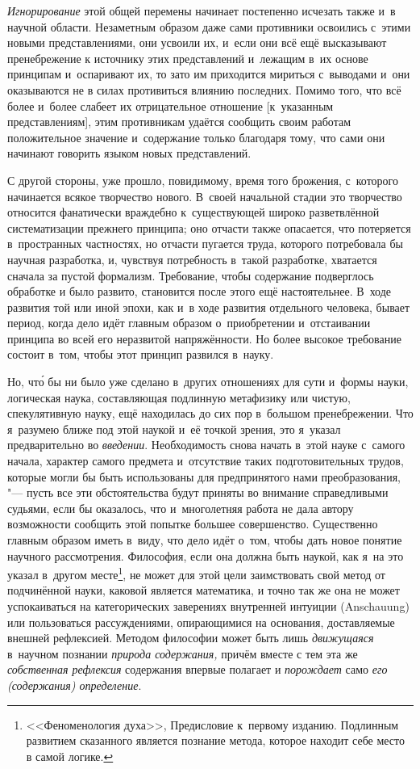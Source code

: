 {\em Игнорирование} этой общей перемены начинает постепенно исчезать также и~в
научной области. Незаметным образом даже сами противники освоились с~этими
новыми представлениями, они усвоили их, и~если они всё ещё высказывают пренебрежение
к источнику этих представлений и~лежащим в~их основе принципам и~оспаривают
их, то зато им приходится мириться с~выводами и~они оказываются не в
силах противиться влиянию последних. Помимо того, что всё более и~более слабеет
их отрицательное отношение [к~указанным представлениям], этим противникам удаётся
сообщить своим работам положительное значение и~содержание только благодаря
тому, что сами они начинают говорить языком новых представлений.

С другой стороны, уже прошло, повидимому, время того брожения, с~которого
начинается всякое творчество нового. В~своей начальной стадии это творчество
относится фанатически враждебно к~существующей широко разветвлённой
систематизации прежнего принципа; оно отчасти также опасается, что потеряется
в~пространных частностях, но отчасти пугается труда, которого потребовала бы
научная разработка, и, чувствуя потребность в~такой разработке, хватается
сначала за пустой формализм. Требование, чтобы содержание подверглось обработке
и было развито, становится после этого ещё настоятельнее. В~ходе развития той
или иной эпохи, как и~в ходе развития отдельного человека, бывает период, когда
дело идёт главным образом о~приобретении и~отстаивании принципа во всей его
неразвитой напряжённости. Но более высокое требование состоит в~том, чтобы этот
принцип развился в~науку.

Но, чт\'{о} бы ни было уже сделано в~других отношениях для сути и~формы науки,
логическая наука, составляющая подлинную метафизику или чистую, спекулятивную
науку, ещё находилась до сих пор в~большом пренебрежении. Что я~разумею ближе
под этой наукой и~её точкой зрения, это я~указал предварительно во
{\em введении}. Необходимость снова начать в~этой науке с~самого начала,
характер самого предмета и~отсутствие таких подготовительных трудов, которые
могли бы быть использованы для предпринятого нами преобразования, "--- пусть
все эти обстоятельства будут приняты во внимание справедливыми судьями, если бы
оказалось, что и~многолетняя работа не дала автору возможности сообщить этой
попытке большее совершенство. Существенно главным образом иметь в~виду, что
дело идёт о~том, чтобы дать новое понятие научного рассмотрения. Философия,
если она должна быть наукой, как я~на это указал в~другом
месте\footnote{<<Феноменология духа>>, Предисловие к~первому изданию. Подлинным
развитием сказанного является познание метода, которое находит себе место в
самой логике.}, не может для этой цели
заимствовать свой метод от подчинённой науки, каковой является математика, и
точно так же она не может успокаиваться на категорических заверениях внутренней
интуиции (Anschauung) или пользоваться рассуждениями, опирающимися на
основания, доставляемые внешней рефлексией. Методом философии может быть лишь
{\em движущаяся} в~научном познании {\em природа содержания,} причём вместе с
тем эта же {\em собственная рефлексия} содержания впервые полагает и
{\em порождает} само {\em его (содержания) определение}.

